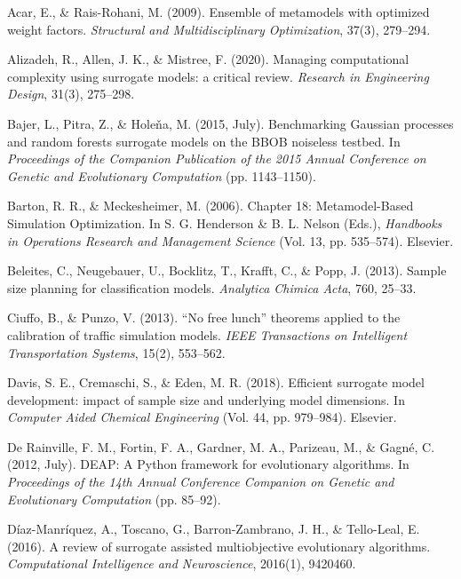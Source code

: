 \documentclass[sigconf,nonacm]{acmart}
\begin{document}
\begin{enumerate}[label={[\arabic*]}]

\item Acar, E., \& Rais-Rohani, M. (2009). Ensemble of metamodels with optimized weight factors. \textit{Structural and Multidisciplinary Optimization}, 37(3), 279--294.

\item Alizadeh, R., Allen, J. K., \& Mistree, F. (2020). Managing computational complexity using surrogate models: a critical review. \textit{Research in Engineering Design}, 31(3), 275--298.

\item Bajer, L., Pitra, Z., \& Holeňa, M. (2015, July). Benchmarking Gaussian processes and random forests surrogate models on the BBOB noiseless testbed. In \textit{Proceedings of the Companion Publication of the 2015 Annual Conference on Genetic and Evolutionary Computation} (pp. 1143--1150).

\item Barton, R. R., \& Meckesheimer, M. (2006). Chapter 18: Metamodel-Based Simulation Optimization. In S. G. Henderson \& B. L. Nelson (Eds.), \textit{Handbooks in Operations Research and Management Science} (Vol. 13, pp. 535--574). Elsevier.

\item Beleites, C., Neugebauer, U., Bocklitz, T., Krafft, C., \& Popp, J. (2013). Sample size planning for classification models. \textit{Analytica Chimica Acta}, 760, 25--33.

\item Ciuffo, B., \& Punzo, V. (2013). ``No free lunch'' theorems applied to the calibration of traffic simulation models. \textit{IEEE Transactions on Intelligent Transportation Systems}, 15(2), 553--562.

\item Davis, S. E., Cremaschi, S., \& Eden, M. R. (2018). Efficient surrogate model development: impact of sample size and underlying model dimensions. In \textit{Computer Aided Chemical Engineering} (Vol. 44, pp. 979--984). Elsevier.

\item De Rainville, F. M., Fortin, F. A., Gardner, M. A., Parizeau, M., \& Gagné, C. (2012, July). DEAP: A Python framework for evolutionary algorithms. In \textit{Proceedings of the 14th Annual Conference Companion on Genetic and Evolutionary Computation} (pp. 85--92).

\item Díaz-Manríquez, A., Toscano, G., Barron-Zambrano, J. H., \& Tello-Leal, E. (2016). A review of surrogate assisted multiobjective evolutionary algorithms. \textit{Computational Intelligence and Neuroscience}, 2016(1), 9420460.


\end{enumerate}
\end{document}
